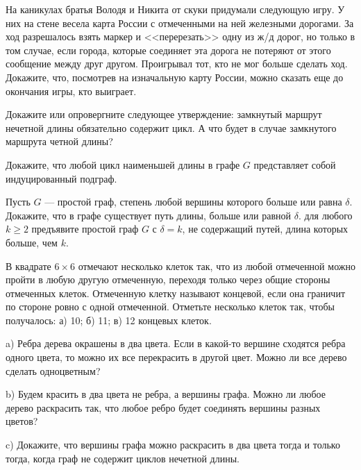 
\begin{exersize}
	На каникулах братья Володя и Никита от скуки придумали следующую игру. У них на стене весела карта России с отмеченными на ней железными дорогами. За ход разрешалось взять маркер и <<перерезать>> одну из ж/д дорог, но только в том случае, если города, которые соединяет эта дорога не потеряют от этого сообщение между друг другом. Проигрывал тот, кто не мог больше сделать ход. Докажите, что, посмотрев на изначальную карту России, можно сказать еще до окончания игры, кто выиграет.
\end{exersize}

\begin{exersize}
	Докажите или опровергните следующее утверждение: замкнутый маршрут нечетной длины обязательно содержит цикл. А что будет в случае замкнутого маршрута четной длины?
\end{exersize}

\begin{exersize}
	Докажите, что любой цикл наименьшей длины в графе $G$
	представляет собой индуцированный подграф.
\end{exersize}

\begin{exersize}
	Пусть $G$ --- простой граф, степень любой вершины которого больше
	или равна $\delta$. Докажите, что в графе существует путь длины,
	больше или равной $\delta$. для любого $k \geqslant 2$ предъявите
	простой граф $G$ с $\delta = k$, не содержащий путей, длина которых
	больше, чем $k$.
\end{exersize}

\begin{exersize}
	В квадрате $6 \times 6$ отмечают несколько клеток так, что из любой отмеченной можно пройти в любую другую отмеченную, переходя только через общие стороны отмеченных клеток. Отмеченную клетку называют концевой, если она граничит по стороне ровно с одной отмеченной. Отметьте несколько клеток так, чтобы получалось: а) 10; б) 11; в) 12 концевых клеток.
\end{exersize}

\begin{exersize}
	a) Ребра дерева окрашены в два цвета. Если в какой-то вершине сходятся ребра одного цвета, то можно их все перекрасить в другой цвет. Можно ли все дерево сделать одноцветным?
	
	b) Будем красить в два цвета не ребра, а вершины графа. Можно ли любое дерево раскрасить так, что любое ребро будет соединять вершины разных цветов?
	
	c) Докажите, что вершины графа можно раскрасить в два цвета тогда и только тогда, когда граф не содержит циклов нечетной длины.
\end{exersize}	


